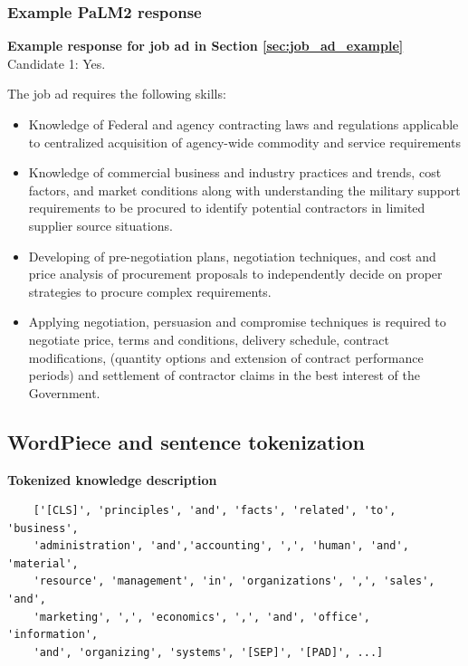 \documentclass[12pt]{article}
\begin{document}
\subsubsection{Example PaLM2 response}\label{sec:palm_response}

\textbf{Example response for job ad in Section \ref{sec:job_ad_example}}\\

Candidate 1: Yes.

The job ad requires the following skills:

\begin{itemize}
  \item Knowledge of Federal and agency contracting laws and regulations applicable to centralized acquisition of agency-wide commodity and service requirements
  \item Knowledge of commercial business and industry practices and trends, cost factors, and market conditions along with understanding the military support requirements to be procured to identify potential contractors in limited supplier source situations.
  \item Developing of pre-negotiation plans, negotiation techniques, and cost and price analysis of procurement proposals to independently decide on proper strategies to procure complex requirements.
  \item Applying negotiation, persuasion and compromise techniques is required to negotiate price, terms and conditions, delivery schedule, contract modifications, (quantity options and extension of contract performance periods) and settlement of contractor claims in the best interest of the Government.
\end{itemize}

\clearpage

\subsection{WordPiece and sentence tokenization}\label{sec:wordpiece}

\textbf{Tokenized knowledge description}

\begin{verbatim}
    ['[CLS]', 'principles', 'and', 'facts', 'related', 'to', 'business', 
    'administration', 'and','accounting', ',', 'human', 'and', 'material', 
    'resource', 'management', 'in', 'organizations', ',', 'sales', 'and', 
    'marketing', ',', 'economics', ',', 'and', 'office', 'information', 
    'and', 'organizing', 'systems', '[SEP]', '[PAD]', ...]
\end{verbatim}
    
\end{document}
